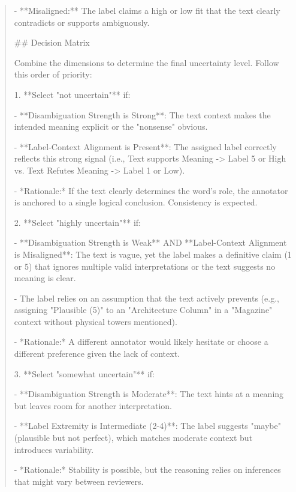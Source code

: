 \begin{quote}
- **Misaligned:** The label claims a high or low fit that the text clearly contradicts or supports ambiguously.



## Decision Matrix



Combine the dimensions to determine the final uncertainty level. Follow this order of priority:



1.  **Select "not uncertain"** if:

    -   **Disambiguation Strength is Strong**: The text context makes the intended meaning explicit or the "nonsense" obvious.

    -   **Label-Context Alignment is Present**: The assigned label correctly reflects this strong signal (i.e., Text supports Meaning -> Label 5 or High vs. Text Refutes Meaning -> Label 1 or Low).

    -   *Rationale:* If the text clearly determines the word's role, the annotator is anchored to a single logical conclusion. Consistency is expected.



2.  **Select "highly uncertain"** if:

    -   **Disambiguation Strength is Weak** AND **Label-Context Alignment is Misaligned**: The text is vague, yet the label makes a definitive claim (1 or 5) that ignores multiple valid interpretations or the text suggests no meaning is clear.

    -   The label relies on an assumption that the text actively prevents (e.g., assigning "Plausible (5)" to an "Architecture Column" in a "Magazine" context without physical towers mentioned).

    -   *Rationale:* A different annotator would likely hesitate or choose a different preference given the lack of context.



3.  **Select "somewhat uncertain"** if:

    -   **Disambiguation Strength is Moderate**: The text hints at a meaning but leaves room for another interpretation.

    -   **Label Extremity is Intermediate (2-4)**: The label suggests "maybe" (plausible but not perfect), which matches moderate context but introduces variability.

    -   *Rationale:* Stability is possible, but the reasoning relies on inferences that might vary between reviewers.




\end{quote}
